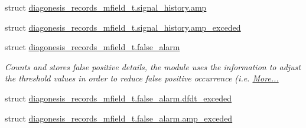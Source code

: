 \begin{DoxyCompactItemize}
\item 
struct \hyperlink{a00019_da/dbf/a00393}{diagonesis\+\_\+records\+\_\+mfield\+\_\+t.\+signal\+\_\+history.\+amp}
\item 
struct \hyperlink{a00019_d9/dad/a00394}{diagonesis\+\_\+records\+\_\+mfield\+\_\+t.\+signal\+\_\+history.\+amp\+\_\+exceded}
\item 
struct \hyperlink{a00019_dc/dc9/a00389}{diagonesis\+\_\+records\+\_\+mfield\+\_\+t.\+false\+\_\+alarm}
\begin{DoxyCompactList}\small\item\em Counts and stores false positive details, the module uses the information to adjust the threshold values in order to reduce false positive occurrence (i.\+e.  \hyperlink{a00019_dc/dc9/a00389}{More...}\end{DoxyCompactList}\item 
struct \hyperlink{a00019_db/d95/a00391}{diagonesis\+\_\+records\+\_\+mfield\+\_\+t.\+false\+\_\+alarm.\+dfdt\+\_\+exceded}
\item 
struct \hyperlink{a00019_d9/d0a/a00390}{diagonesis\+\_\+records\+\_\+mfield\+\_\+t.\+false\+\_\+alarm.\+amp\+\_\+exceded}
\end{DoxyCompactItemize}
